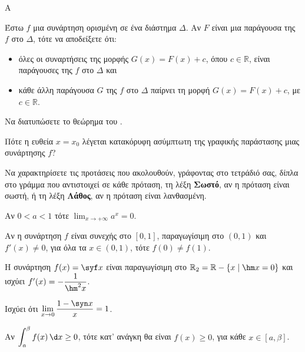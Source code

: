 \begin{thema}{Α}
\begin{erwthma}
    \item Έστω $f$ μια συνάρτηση ορισμένη σε ένα διάστημα $\Delta$. Αν $F$ είναι μια παράγουσα της $f$ στο $\Delta$, τότε να αποδείξετε ότι:
    \begin{itemize}
        \item όλες οι συναρτήσεις της μορφής $G(x) = F(x) + c$, όπου $c \in \mathbb{R}$, είναι παράγουσες της $f$ στο $\Delta$ και
        \item κάθε άλλη παράγουσα $G$ της $f$ στο $\Delta$ παίρνει τη μορφή $G(x) = F(x) + c$, με $c \in \mathbb{R}$.
    \end{itemize}

    \item Να διατυπώσετε το θεώρημα του . 

    \item Πότε η ευθεία $x = x_0$ λέγεται κατακόρυφη ασύμπτωτη της γραφικής παράστασης μιας συνάρτησης $f$? 

    \item Να χαρακτηρίσετε τις προτάσεις που ακολουθούν, γράφοντας στο τετράδιό σας, δίπλα στο γράμμα που αντιστοιχεί σε κάθε πρόταση, τη λέξη \textbf{Σωστό}, αν η πρόταση είναι σωστή, ή τη λέξη \textbf{Λάθος}, αν η πρόταση είναι λανθασμένη.
    \begin{alist}
        \item Αν $0 < a < 1$ τότε $\displaystyle\lim_{x \to +\infty} a^x = 0$.

        \item Αν η συνάρτηση $f$ είναι συνεχής στο $[0,1]$, παραγωγίσιμη στο $(0,1)$ και $f'(x) \neq 0$, για όλα τα $x \in (0,1)$, τότε $f(0) \neq f(1)$.

        \item Η συνάρτηση $f(x) = \syf x$ είναι παραγωγίσιμη στο $\mathbb{R}_2 = \mathbb{R} - \{x \mid \hm x = 0\}$ και ισχύει $f'(x) = -\dfrac{1}{\hm^2 x}$.

        \item Ισχύει ότι $\displaystyle\lim_{x \to 0} \dfrac{1 - \syn x}{x} = 1$.

        \item Αν $\displaystyle\int_a^\beta f(x)\,\d x \geq 0$, τότε κατ' ανάγκη θα είναι $f(x) \geq 0$, για κάθε $x \in [a, \beta]$.
    \end{alist}
\end{erwthma}
\end{thema}

